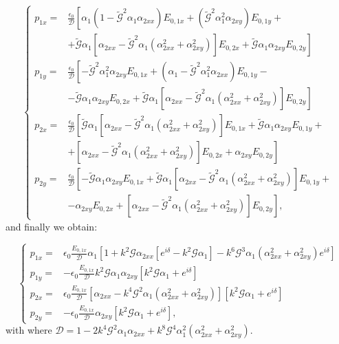 \[
\begin{cases}
p_{1x}= & \frac{\epsilon_{0}}{\mathcal{D}}\left[\alpha_{1}\left(1-\tilde{\mathcal{G}}^{2}\alpha_{1}\alpha_{2xx}\right)E_{0,1x}+\left(\tilde{\mathcal{G}}^{2}\alpha_{1}^{2}\alpha_{2xy}\right)E_{0,1y}+\right.\\
 & \left.+\tilde{\mathcal{G}}\alpha_{1}\left[\alpha_{2xx}-\tilde{\mathcal{G}}^{2}\alpha_{1}\left(\alpha_{2xx}^{2}+\alpha_{2xy}^{2}\right)\right]E_{0,2x}+\tilde{\mathcal{G}}\alpha_{1}\alpha_{2xy}E_{0,2y}\right]\\
p_{1y}= & \frac{\epsilon_{0}}{\mathcal{D}}\left[-\tilde{\mathcal{G}}^{2}\alpha_{1}^{2}\alpha_{2xy}E_{0,1x}+\left(\alpha_{1}-\tilde{\mathcal{G}}^{2}\alpha_{1}^{2}\alpha_{2xx}\right)E_{0,1y}-\right.\\
 & \left.-\tilde{\mathcal{G}}\alpha_{1}\alpha_{2xy}E_{0,2x}+\tilde{\mathcal{G}}\alpha_{1}\left[\alpha_{2xx}-\tilde{\mathcal{G}}^{2}\alpha_{1}\left(\alpha_{2xx}^{2}+\alpha_{2xy}^{2}\right)\right]E_{0,2y}\right]\\
p_{2x}= & \frac{\epsilon_{0}}{\mathcal{D}}\left[\tilde{\mathcal{G}}\alpha_{1}\left[\alpha_{2xx}-\tilde{\mathcal{G}}^{2}\alpha_{1}\left(\alpha_{2xx}^{2}+\alpha_{2xy}^{2}\right)\right]E_{0,1x}+\tilde{\mathcal{G}}\alpha_{1}\alpha_{2xy}E_{0,1y}+\right.\\
 & \left.+\left[\alpha_{2xx}-\tilde{\mathcal{G}}^{2}\alpha_{1}\left(\alpha_{2xx}^{2}+\alpha_{2xy}^{2}\right)\right]E_{0,2x}+\alpha_{2xy}E_{0,2y}\right]\\
p_{2y}= & \frac{\epsilon_{0}}{\mathcal{D}}\left[-\tilde{\mathcal{G}}\alpha_{1}\alpha_{2xy}E_{0,1x}+\tilde{\mathcal{G}}\alpha_{1}\left[\alpha_{2xx}-\tilde{\mathcal{G}}^{2}\alpha_{1}\left(\alpha_{2xx}^{2}+\alpha_{2xy}^{2}\right)\right]E_{0,1y}+\right.\\
 & \left.-\alpha_{2xy}E_{0,2x}+\left[\alpha_{2xx}-\tilde{\mathcal{G}}^{2}\alpha_{1}\left(\alpha_{2xx}^{2}+\alpha_{2xy}^{2}\right)\right]E_{0,2y}\right],
\end{cases}
\]
and finally we obtain:

\[
\begin{cases}
p_{1x}= & \epsilon_{0}\frac{E_{0,1x}}{\mathcal{D}}\alpha_{1}\left[1+k^2\mathcal{G}\alpha_{2xx}\left[e^{i\delta}-k^2\mathcal{G}\alpha_{1}\right]-k^6\mathcal{G}^{3}\alpha_{1}\left(\alpha_{2xx}^{2}+\alpha_{2xy}^{2}\right)e^{i\delta}\right]\\
p_{1y}= & -\epsilon_{0}\frac{E_{0,1x}}{\mathcal{D}}k^2\mathcal{G}\alpha_{1}\alpha_{2xy}\left[k^2\mathcal{G}\alpha_{1}+e^{i\delta}\right]\\
p_{2x}= & \epsilon_{0}\frac{E_{0,1x}}{\mathcal{D}}\left[\alpha_{2xx}-k^4\mathcal{G}^{2}\alpha_{1}\left(\alpha_{2xx}^{2}+\alpha_{2xy}^{2}\right)\right]\left[k^2\mathcal{G}\alpha_{1}+e^{i\delta}\right]\\
p_{2y}= & -\epsilon_{0}\frac{E_{0,1x}}{\mathcal{D}}\alpha_{2xy}\left[k^2\mathcal{G}\alpha_{1}+e^{i\delta}\right],
\end{cases}
\]
with where $\mathcal{D} = 1 - 2k^4\mathcal{G}^2\alpha_{1}\alpha_{2xx}+k^8\mathcal{G}^4\alpha_1^2\left(\alpha_{2xx}^2+ \alpha_{2xy}^2\right)$.
